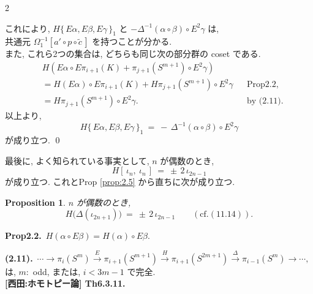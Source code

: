 \documentclass[10pt, leqno]{ltjsarticle} %
\newcommand{\todai}[2][]{\{\,#2\,\}_{#1}}      %
\newcommand{\pis}[2]{\pi_{#1}(#2)}       %
\numberwithin{equation}{section}
\theoremstyle{plain}
\newtheorem{proposition}[theorem]{Proposition}
\theoremstyle{definition}
\theoremstyle{remark}
\begin{document}
\begin{paracol}{2}

これにより, 
\(H\todai[1]{E\alpha, E\beta, E\gamma}\) と
\(-\Delta^{-1}(\alpha\circ\beta)\circ E^2\gamma\) は, \\
共通元 $\Omega_1^{-1}[a'\circ p\circ\widetilde{c}\,]$ を持つことが分かる. \\
また, これら2つの集合は, どちらも同じ次の部分群の coset である.
\begin{align*}
& H(E\alpha\circ E\pi_{i+1}(K) + \pi_{j+1}(S^{m+1})\circ E^2\gamma)\\
& = H(E\alpha)\circ E\pi_{i+1}(K) + H\pi_{j+1}(S^{m+1})\circ E^2\gamma
&& \text{Prop2.2,}\\
& = H\pi_{j+1}(S^{m+1})\circ E^2\gamma .
&& \text{by (2.11).}
\end{align*}
以上より, 
\[
H\todai[1]{E\alpha,E\beta,E\gamma}\ 
=\ -\,\Delta^{-1}(\alpha\circ\beta)\circ E^2\gamma
\]
が成り立つ. 
\qed

最後に, よく知られている事実として, $n$ が偶数のとき, 
\[
H[\,\iota_n,\ \iota_n\,]\ =\ \pm\,2\,\iota_{2n-1}
\]
が成り立つ. これとProp \ref{prop:2.5} から直ちに次が成り立つ. 

\begin{proposition}\label{prop:2.7}
$n$ が偶数のとき,
\[
H\!\bigl(\Delta(\iota_{2n+1})\bigr)\ =\ \pm\,2\,\iota_{2n-1}
\qquad (\text{cf.} (11.14)).
\]
\end{proposition}


\switchcolumn

\noindent
\textbf{Prop2.2.}\
\(H(\alpha\circ E\beta) = H(\alpha)\circ E\beta.\)

\noindent
\textbf{(2.11).}\
\(\cdots\to\pis{i}{S^m}
\xrightarrow{E}\pis{i+1}{S^{m+1}}
\xrightarrow{H}\pis{i+1}{S^{2m+1}}
\xrightarrow{\Delta}\pis{i-1}{S^m}
\to\cdots,\)\\
は, \(m:\) odd, または, \(i<3m-1\) で完全.\\

\noindent
\textbf{[西田:ホモトピー論] Th6.3.11.}\\


\end{paracol}
\end{document}
